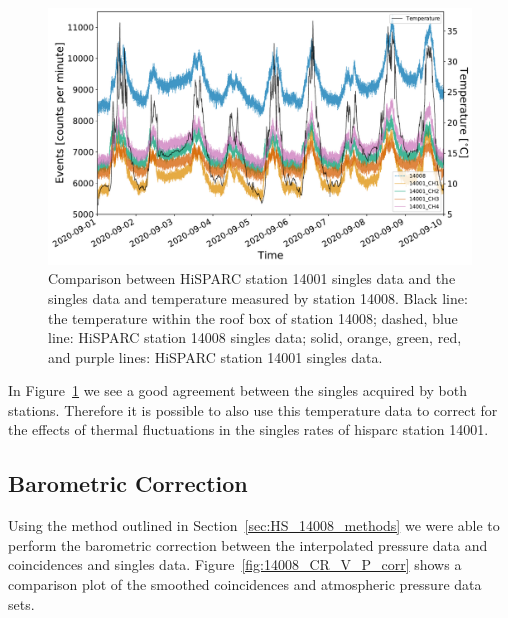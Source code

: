 \begin{figure}[ht!]
	\centering
	\includegraphics[width=0.8\columnwidth]{HS_14008_vs_14001_and_temp.pdf}
	\caption{Comparison between HiSPARC station 14001 singles data and the singles data and temperature measured by station 14008. Black line: the temperature within the roof box of station 14008; dashed, blue line: HiSPARC station 14008 singles data; solid, orange, green, red, and purple lines: HiSPARC station 14001 singles data.}
	\label{fig:HS_14008_14001_vs_T}
\end{figure}

In Figure~\ref{fig:HS_14008_14001_vs_T} we see a good agreement between the singles acquired by both stations. Therefore it is possible to also use this temperature data to correct for the effects of thermal fluctuations in the singles rates of \gls{hisparc} station 14001.



\subsection{Barometric Correction}\label{sec:HS_14008_P_corr}


Using the method outlined in Section~\ref{sec:HS_14008_methods} we were able to perform the barometric correction between the interpolated pressure data and coincidences and singles data. Figure~\ref{fig:14008_CR_V_P_corr} shows a comparison plot of the smoothed coincidences and atmospheric pressure data sets.


